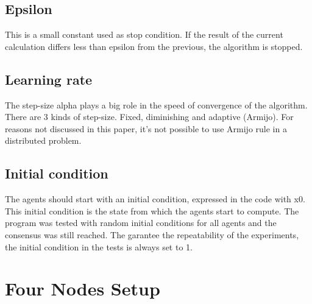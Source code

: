 \documentclass[a4paper,11pt,oneside]{book}
\begin{document}
\subsection{Epsilon} \label{Subsec2.2.2}
This is a small constant used as stop condition. If the result of the current calculation differs less than epsilon from the previous, the algorithm is stopped.

\subsection{Learning rate} \label{Subsec2.2.3}
The step-size alpha plays a big role in the speed of convergence of the algorithm. There are 3 kinds of step-size. Fixed, diminishing and adaptive (Armijo). For reasons not discussed in this paper, it's not possible to use Armijo rule in a distributed problem.

\subsection{Initial condition} \label{Subsec2.2.4}
The agents should start with an initial condition, expressed in the code with x0. This initial condition is the state from which the agents start to compute. The program was tested with random initial conditions for all agents and the consensus was still reached. The garantee the repeatability of the experiments, the initial condition in the tests is always set to 1.

\section{Four Nodes Setup} \label{Sec2.2}
\end{document}
